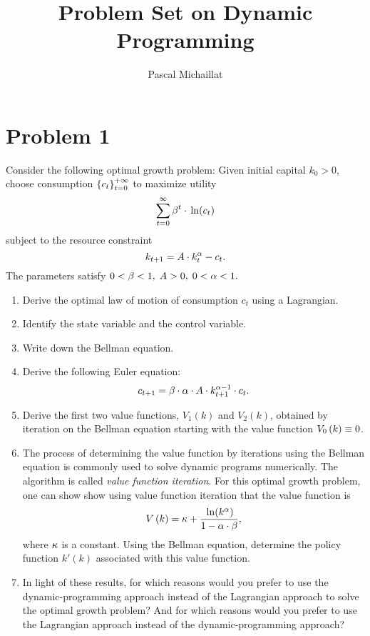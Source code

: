 \documentclass[letterpaper,12pt,leqno]{article}
\begin{document}
\title{Problem Set on Dynamic Programming}
\author{Pascal Michaillat}
\date{}

\begin{titlepage}
\maketitle
\end{titlepage}

\section*{Problem 1}

Consider the following optimal growth problem: Given initial capital $k_{0}>0$, choose consumption $\left\lbrace c_{t} \right\rbrace _{t =0}^{+\infty}$ to maximize utility
\begin{equation*}
\sum_{t=0}^{\infty}\b ^{t}\cdot \ln{c_{t}}
\end{equation*}
subject to the resource constraint
\begin{equation*}
k_{t+1}=A\cdot k_{t}^{\alpha}-c_{t}.
\end{equation*}
The parameters satisfy $0<\beta<1,\;A>0,\;0<\alpha <1.$

\begin{enumerate}
\item Derive the optimal law of motion of consumption $c_{t}$ using a Lagrangian.
\item Identify the state variable and the control variable. 
\item Write down the Bellman equation.
\item Derive the following Euler equation: 
\begin{equation*}
c_{t+1}=\beta\cdot  \alpha\cdot  A\cdot k_{t+1}^{\alpha -1}\cdot c_{t}.
\end{equation*}

\item Derive the first two value functions, $V_{1}(k)$ and  $V_{2}(k)$, obtained by iteration on the Bellman equation starting with the value function $V_{0}\left( k \right) \equiv 0$. 
\item The process of determining the value function by iterations using the Bellman equation is commonly used to solve dynamic programs numerically. The algorithm is called \textit{value function iteration}. For this optimal growth problem, one can show show using value function iteration that the value function is
\[V\bp{k} =\kappa +\frac{\ln{k^{\a}}}{1-\a\cdot \b},\]
where $\kappa$ is a constant. Using the Bellman equation, determine the policy function $k'(k)$ associated with this value function.
\item In light of these results, for which reasons would you prefer to use the dynamic-programming approach instead of the Lagrangian approach to solve the optimal growth problem? And for which reasons would you prefer to use the Lagrangian approach instead of the dynamic-programming approach?
\end{enumerate}
\end{document}
